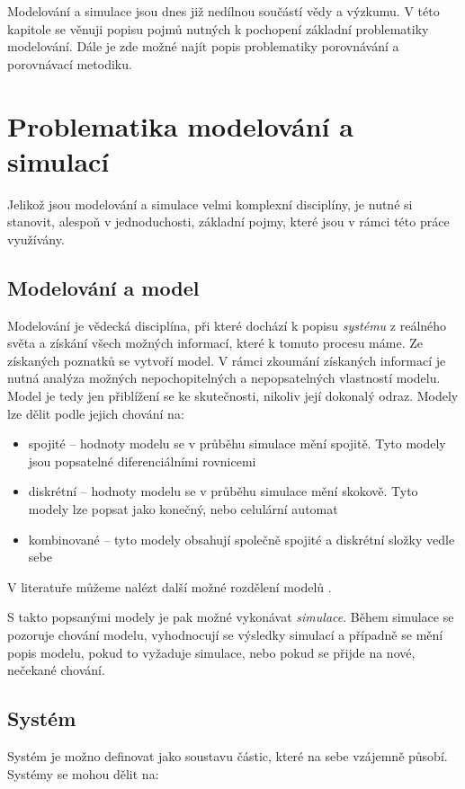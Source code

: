 Modelování a simulace jsou dnes již nedílnou součástí vědy a výzkumu. V této kapitole se věnuji popisu pojmů nutných k pochopení základní problematiky modelování. Dále je zde možné najít popis problematiky porovnávání a porovnávací metodiku.

\section{Problematika modelování a simulací}
Jelikož jsou modelování a simulace velmi komplexní disciplíny, je nutné si stanovit, alespoň v jednoduchosti, základní pojmy, které jsou v rámci této práce využívány. 

\subsection{Modelování a model}
\label{modelovani}
Modelování je vědecká disciplína, při které dochází k popisu \textit{systému} z reálného světa a získání všech možných informací, které k tomuto procesu máme. Ze získaných poznatků se vytvoří model. V rámci zkoumání získaných informací je nutná analýza možných nepochopitelných a nepopsatelných vlastností modelu. Model je tedy jen přiblížení se ke skutečnosti, nikoliv její dokonalý odraz. Modely lze dělit podle jejich chování na:

\begin{itemize}
    \item spojité -- hodnoty modelu se v průběhu simulace mění spojitě. Tyto modely jsou popsatelné diferenciálními rovnicemi
    \item diskrétní -- hodnoty modelu se v průběhu simulace mění skokově. Tyto modely lze popsat jako konečný, nebo celulární automat
    \item kombinované -- tyto modely obsahují společně spojité a diskrétní složky vedle sebe
\end{itemize}

V literatuře můžeme nalézt další možné rozdělení modelů \cite{IMS-skripta}.


S takto popsanými modely je pak možné vykonávat \textit{simulace}. Během simulace se pozoruje chování modelu, vyhodnocují se výsledky simulací a případně se mění popis modelu, pokud to vyžaduje simulace, nebo pokud se přijde na nové, nečekané chování.

\subsection{Systém}
Systém je možno definovat jako soustavu částic, které na sebe vzájemně působí. Systémy se mohou dělit na:

